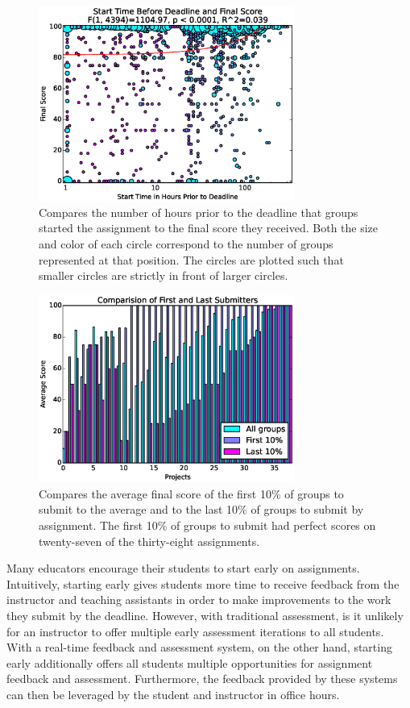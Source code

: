\begin{figure}[!t]
\centering
\includegraphics[width=3.3in]{graphs/Start_Time_Before_Deadline_and_Final_Score.eps}
\caption{Compares the number of hours prior to the deadline that groups started
  the assignment to the final score they received. Both the size and color of
  each circle correspond to the number of groups represented at that
  position. The circles are plotted such that smaller circles are strictly in
  front of larger circles.}
\end{figure}

\begin{figure}[!t]
\centering
\includegraphics[width=3.3in]{graphs/Comparision_of_First_and_Last_Submitters.eps}
\caption{Compares the average final score of the first 10\% of groups to submit
  to the average and to the last 10\% of groups to submit by assignment. The
  first 10\% of groups to submit had perfect scores on twenty-seven of the
  thirty-eight assignments.}
\end{figure}

Many educators encourage their students to start early on
assignments. Intuitively, starting early gives students more time to receive
feedback from the instructor and teaching assistants in order to make
improvements to the work they submit by the deadline. However, with traditional
assessment, is it unlikely for an instructor to offer multiple early assessment
iterations to all students. With a real-time feedback and assessment system, on
the other hand, starting early additionally offers all students multiple
opportunities for assignment feedback and assessment. Furthermore, the feedback
provided by these systems can then be leveraged by the student and instructor
in office hours.

